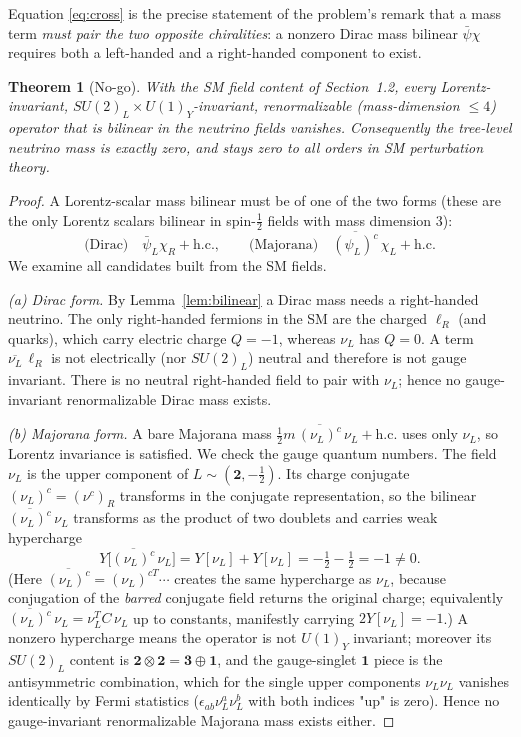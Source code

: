 \documentclass[12pt]{article}
\newtheorem{theorem}{Theorem}
\theoremstyle{definition}
\newcommand{\nuL}{\nu_L}
\begin{document}
Equation \eqref{eq:cross} is the precise statement of the problem's
remark that a mass term \emph{must pair the two opposite chiralities}: a
nonzero Dirac mass bilinear $\bar\psi\chi$ requires both a left-handed
and a right-handed component to exist.

\begin{theorem}[No-go]\label{thm:nogo}
With the SM field content of Section~1.2, every Lorentz-invariant,
$SU(2)_L\times U(1)_Y$-invariant, renormalizable (mass-dimension $\le4$)
operator that is bilinear in the neutrino fields vanishes. Consequently
the tree-level neutrino mass is exactly zero, and stays zero to all
orders in SM perturbation theory.
\end{theorem}

\begin{proof}
A Lorentz-scalar mass bilinear must be of one of the two forms (these are
the only Lorentz scalars bilinear in spin-$\tfrac12$ fields with mass
dimension $3$):
\[
\text{(Dirac)}\quad \bar\psi_L\chi_R+\text{h.c.},
\qquad
\text{(Majorana)}\quad \overline{(\psi_L)^c}\,\chi_L+\text{h.c.}
\]
We examine all candidates built from the SM fields.

\smallskip
\emph{(a) Dirac form.} By Lemma~\ref{lem:bilinear} a Dirac mass needs a
right-handed neutrino. The only right-handed fermions in the SM are the
charged $\ell_{R}$ (and quarks), which carry electric charge
$Q=-1$, whereas $\nuL$ has $Q=0$. A term
$\overline{\nuL}\,\ell_R$ is not electrically (nor $SU(2)_L$) neutral and
therefore is not gauge invariant. There is no neutral right-handed field
to pair with $\nuL$; hence no gauge-invariant renormalizable Dirac mass
exists.

\smallskip
\emph{(b) Majorana form.} A bare Majorana mass
$\tfrac12 m\,\overline{(\nuL)^c}\,\nuL+\text{h.c.}$ uses only $\nuL$, so
Lorentz invariance is satisfied. We check the gauge quantum numbers.
The field $\nuL$ is the upper component of $L\sim(\mathbf 2,-\tfrac12)$.
Its charge conjugate $(\nuL)^c=(\nu^c)_R$ transforms in the conjugate
representation, so the bilinear
$\overline{(\nuL)^c}\,\nuL$ transforms as the product of two doublets and
carries weak hypercharge
\begin{equation}\label{eq:Ycount}
Y\big[\overline{(\nuL)^c}\,\nuL\big]
= Y[\nuL]+Y[\nuL]=-\tfrac12-\tfrac12=-1\neq0 .
\end{equation}
(Here $\overline{(\nuL)^c}=(\nuL)^{cT}\!\cdots$ creates the same
hypercharge as $\nuL$, because conjugation of the \emph{barred} conjugate
field returns the original charge; equivalently
$\overline{(\nuL)^c}\,\nuL=\nuL^T C\,\nuL$ up to constants, manifestly
carrying $2Y[\nuL]=-1$.) A nonzero hypercharge means the operator is not
$U(1)_Y$ invariant; moreover its $SU(2)_L$ content is
$\mathbf2\otimes\mathbf2=\mathbf3\oplus\mathbf1$, and the gauge-singlet
$\mathbf1$ piece is the antisymmetric combination, which for the single
upper components $\nuL\nuL$ vanishes identically by Fermi statistics
($\epsilon_{ab}\nu_L^a\nu_L^b$ with both indices "up" is zero). Hence no
gauge-invariant renormalizable Majorana mass exists either.


\end{proof}
\end{document}
